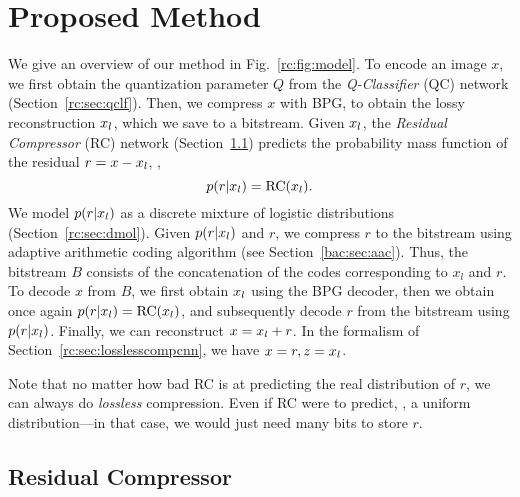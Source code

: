 
\section{Proposed Method}

We give an overview of our method in Fig.~\ref{rc:fig:model}.
To encode an image $x$, we first obtain the quantization parameter $Q$ from the \emph{Q-Classifier} (QC) network (Section~\ref{rc:sec:qclf}).
Then, we compress $x$ with BPG, to obtain the lossy reconstruction $x_l$, which we save to a bitstream. Given $x_l$, the \emph{Residual Compressor} (RC) network (Section~\ref{rc:sec:rc}) predicts the probability mass function of the residual $r = x - x_l$, \ie,
\[
p(r|x_l) = \text{RC}(x_l).
\]
We model $p(r|x_l)$ as a discrete mixture of logistic distributions (Section~\ref{rc:sec:dmol}).
Given $p(r|x_l)$ and $r$, we compress $r$ to the bitstream using adaptive arithmetic coding algorithm (see Section~\ref{bac:sec:aac}). Thus, the bitstream $B$ consists of the concatenation of the codes corresponding to $x_l$ and $r$.
To decode $x$ from $B$, we first obtain $x_l$ using the BPG decoder, then we obtain once again $p(r|x_l) = \text{RC}(x_l)$, and subsequently decode $r$ from the bitstream using $p(r|x_l)$. Finally, we can reconstruct $x = x_l + r$. In the formalism of Section~\ref{rc:sec:losslesscompcnn}, we have $x=r, z=x_l$. 

Note that no matter how bad RC is at predicting the real distribution of $r$, we can always do \emph{lossless} compression. Even if RC were to predict, \eg, a uniform distribution---in that case, we would just need many bits to store $r$.


\subsection{Residual Compressor} \label{rc:sec:rc}

